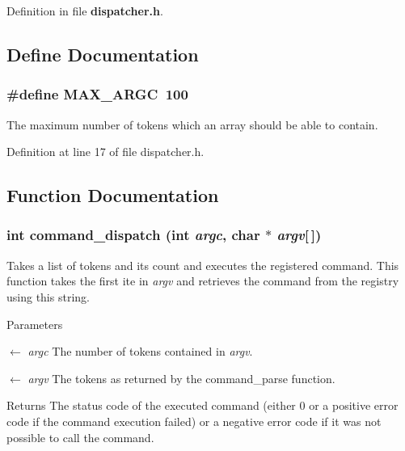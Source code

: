 Definition in file {\bf dispatcher.h}.



\subsection{Define Documentation}
\subsubsection[{MAX\_\-ARGC}]{\setlength{\rightskip}{0pt plus 5cm}\#define MAX\_\-ARGC~100}\label{da/d73/dispatcher_8h_ae1da50c0d24fa0390a6c287d6cb4befe}
The maximum number of tokens which an array should be able to contain. 

Definition at line 17 of file dispatcher.h.



\subsection{Function Documentation}
\subsubsection[{command\_\-dispatch}]{\setlength{\rightskip}{0pt plus 5cm}int command\_\-dispatch (int {\em argc}, \/  char $\ast$ {\em argv}[$\,$])}\label{da/d73/dispatcher_8h_a8da2ffb2b8e7d61768302a02ed1ec372}
Takes a list of tokens and its count and executes the registered command. This function takes the first ite in {\itshape argv\/} and retrieves the command from the registry using this string.


\begin{DoxyParams}{Parameters}
\item[\mbox{$\leftarrow$} {\em argc}]The number of tokens contained in {\itshape argv\/}. \item[\mbox{$\leftarrow$} {\em argv}]The tokens as returned by the {\ttfamily command\_\-parse} function.\end{DoxyParams}
\begin{DoxyReturn}{Returns}
The status code of the executed command (either 0 or a positive error code if the command execution failed) or a negative error code if it was not possible to call the command. 
\end{DoxyReturn}
